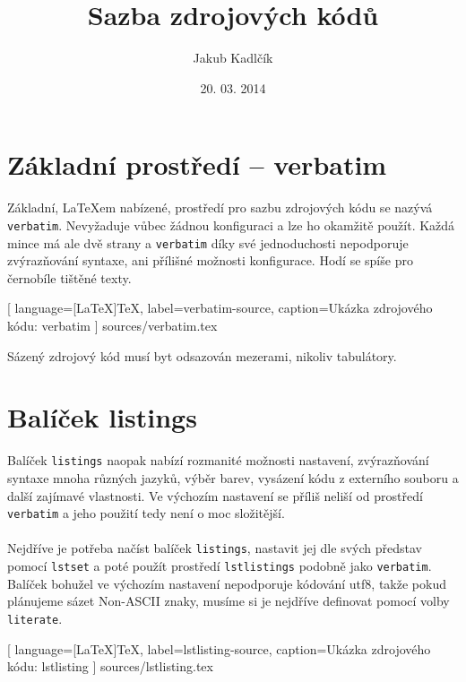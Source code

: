 \documentclass[10pt,a4paper]{article}
\title{Sazba zdrojových kódů}
\author{Jakub Kadlčík}
\date{20. 03. 2014}
\begin{document}
	\maketitle
	\newpage

	\tableofcontents
	\newpage

	\section{Základní prostředí -- verbatim}

		Základní, LaTeXem nabízené, prostředí pro sazbu zdrojových kódu se nazývá \texttt{verbatim}. Nevyžaduje vůbec žádnou konfiguraci a lze ho okamžitě použít. Každá mince má ale dvě strany a \texttt{verbatim} díky své jednoduchosti nepodporuje zvýrazňování syntaxe, ani přílišné možnosti konfigurace. Hodí se spíše pro černobíle tištěné texty.

		\vspace{10pt}
		
		[
			language={[LaTeX]TeX},
			label=verbatim-source,
			caption={Ukázka zdrojového kódu: verbatim}
		] {sources/verbatim.tex}
		\vspace{10pt}

		
		\vspace{10pt}

		Sázený zdrojový kód musí byt odsazován mezerami, nikoliv tabulátory.

	\section{Balíček listings}

		Balíček \texttt{listings} naopak nabízí rozmanité možnosti nastavení, zvýrazňování syntaxe mnoha různých jazyků, výběr barev, vysázení kódu z externího souboru a další zajímavé vlastnosti. Ve výchozím nastavení se příliš neliší od prostředí \texttt{verbatim} a jeho použití tedy není o moc složitější.
		\\
		\\
		Nejdříve je potřeba načíst balíček \texttt{listings}, nastavit jej dle svých představ pomocí \texttt{lstset} a poté použít prostředí \texttt{lstlistings} podobně jako \texttt{verbatim}. Balíček bohužel ve výchozím nastavení nepodporuje kódování utf8, takže pokud plánujeme sázet Non-ASCII znaky, musíme si je nejdříve definovat pomocí volby \texttt{literate}.

		
		[
			language={[LaTeX]TeX},
			label=lstlisting-source,
			caption={Ukázka zdrojového kódu: lstlisting}
		] {sources/lstlisting.tex}
		\vspace{10pt}
\end{document}
